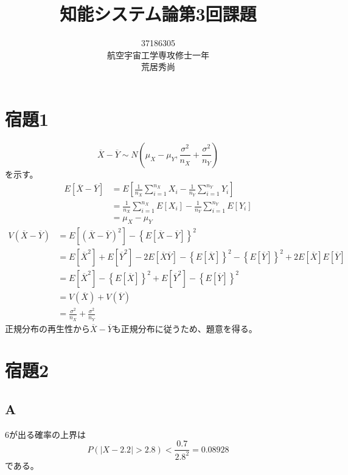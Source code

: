 \documentclass[10pt,a4paper]{ltjsarticle}       %
\title{知能システム論第3回課題}
\author{37186305\\航空宇宙工学専攻修士一年\\荒居秀尚}
\begin{document}
\maketitle

\section{ 宿題1}
\begin{equation}
\overline{X} - \overline{Y}\sim N \left( 
  \mu_{X} - \mu_Y, \frac{\sigma^2}{n_X}+\frac{\sigma^2}{n_Y}
\right)
\end{equation}
を示す。\\

\begin{align}
  E[\overline{X}- \overline{Y}] &= E\left[ \frac{1}{n_X} \sum_{i=1}^{n_X} X_i - \frac{1}{n_Y} \sum_{i=1}^{n_Y}Y_i\right] \\
   &= \frac{1}{n_X}\sum_{i=1}^{n_X}E[X_i] - \frac{1}{n_Y}\sum_{i=1}^{n_Y}E[Y_i] \\
   &= \mu_X - \mu_Y
\end{align}
\begin{align}
  V\left( \overline{X} - \overline{Y} \right) &= E\left[ \left(\overline{X} - \overline{Y}\right)^2 \right] - {\left\{ E\left[\overline{X} - \overline{Y}\right] \right\}}^2 \\
  &= E\left[\overline{X}^2\right] + E\left[\overline{Y}^2\right] - 2E\left[\overline{X}\overline{Y}\right] - {\left\{E\left[\overline{X}\right]\right\}}^2 - {\left\{E\left[\overline{Y}\right]\right\}}^2 + 2E\left[\overline{X}\right]E\left[\overline{Y}\right] \\
  &= E\left[\overline{X}^2\right] - {\left\{E\left[\overline{X}\right]\right\}}^2 + E\left[\overline{Y}^2\right] - {\left\{E\left[\overline{Y}\right]\right\}}^2 \\
  &= V\left(\overline{X}\right) + V\left(\overline{Y}\right) \\
  &= \frac{\sigma^2}{n_X}+\frac{\sigma^2}{n_Y}
\end{align}
正規分布の再生性から$\overline{X}-\overline{Y}$も正規分布に従うため、題意を得る。

\section{宿題2}
\subsection{A}
6が出る確率の上界は
\begin{equation}
P(|X-2.2|>2.8) <\frac{0.7}{2.8^2}=0.08928
\end{equation}
である。
\end{document}

